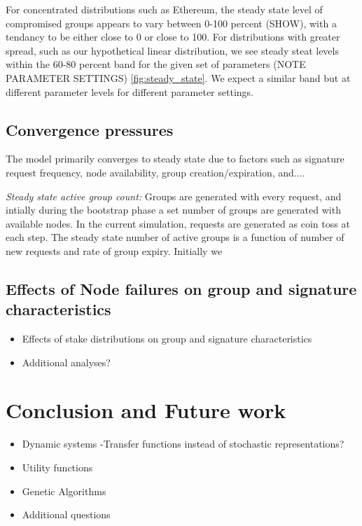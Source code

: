 \documentclass[conference]{IEEEtran}
\begin{document}
For concentrated distributions such as Ethereum, the steady state level of compromised
groups appears to vary between 0-100 percent (SHOW), with a tendancy to be either close
to 0 or close to 100. For distributions with greater spread, such as our hypothetical linear
distribution, we see steady steat levels within the 60-80 percent band for the given set
of parameters (NOTE PARAMETER SETTINGS) \ref{fig:steady_state}. We expect a similar band but at
different parameter levels for different parameter settings.

\subsection{Convergence pressures}

The model primarily converges to steady state due to factors such as
signature request frequency, node availability, group creation/expiration, and....

\textit{ Steady state active group count:} Groups are generated with every request, and intially
during the bootstrap phase a set number of groups are generated with available nodes. In the current
simulation, requests are generated as coin toss at each step. The steady state number of active groups
is a function of number of new requests and rate of group expiry. Initially we 


\subsection{Effects of Node failures on group and signature characteristics}

\begin{itemize}
    \item Effects of stake distributions on group and signature characteristics
    \item Additional analyses?
\end{itemize}

\section{Conclusion and Future work}
\begin{itemize}
\item Dynamic systems -Transfer functions instead of stochastic representations?
\item Utility functions
\item Genetic Algorithms
\item Additional questions
\end{itemize}
\end{document}
